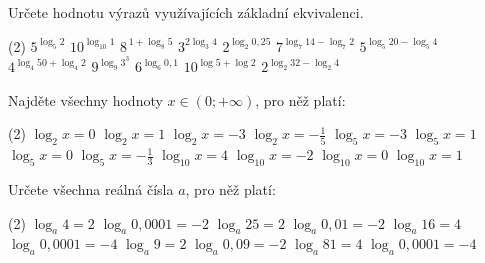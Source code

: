 \documentclass[12pt,a4paper]{article}
\begin{document}
\begin{exercise}
    Určete hodnotu výrazů využívajících základní ekvivalenci.
    \begin{tasks}(2)
        \task $5^{\log_5 2}$
        \task $10^{\log_{10} 1}$
        \task $8^{\,1+\log_{8} 5}$
        \task $3^{2\log_{3} 4}$
        \task $2^{\log_{2} 0{,}25}$
        \task $7^{\log_{7} 14 - \log_{7} 2}$
        \task $5^{\log_{5} 20 - \log_{5} 4}$
        \task $4^{\log_{4} 50 + \log_{4} 2}$
        \task $9^{\log_{9} 3^{3}}$
        \task $6^{\log_{6} 0{,}1}$
        \task $10^{\log 5 + \log 2}$
        \task $2^{\log_2 32 - \log_2 4}$
    \end{tasks}
\end{exercise}


\begin{exercise}
    Najděte všechny hodnoty $x \in (0; +\infty)$, pro něž platí:
    \begin{tasks}(2)
        \task $\log_2 x = 0$
        \task $\log_2 x = 1$
        \task $\log_2 x = -3$
        \task $\log_2 x = -\frac{1}{5}$
        \task $\log_5 x = -3$
        \task $\log_5 x = 1$
        \task $\log_5 x = 0$
        \task $\log_5 x = -\frac{1}{3}$
        \task $\log_{10} x = 4$
        \task $\log_{10} x = -2$
        \task $\log_{10} x = 0$
        \task $\log_{10} x = 1$
    \end{tasks}
\end{exercise}


\begin{exercise}
    Určete všechna reálná čísla $a$, pro něž platí:
    \begin{tasks}(2)
        \task $\log_a 4 = 2$
        \task $\log_a 0{,}0001 = -2$
        \task $\log_a 25 = 2$
        \task $\log_a 0{,}01 = -2$
        \task $\log_a 16 = 4$
        \task $\log_a 0{,}0001 = -4$
        \task $\log_a 9 = 2$
        \task $\log_a 0{,}09 = -2$
        \task $\log_a 81 = 4$
        \task $\log_a 0{,}0001 = -4$
    \end{tasks}
\end{exercise}
\end{document}
